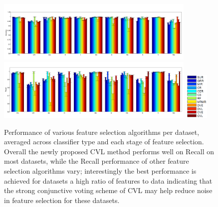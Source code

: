 \begin{figure}[tbp!]
\includegraphics[width=0.85\textwidth]{./figures/dataset_perf/Accuracy.pdf}\\
\includegraphics[width=0.85\textwidth]{./figures/dataset_perf/Recall.pdf}
\includegraphics[width=0.10\textwidth]{./figures/dataset_perf/legend.PNG}
\vspace{-2mm}
\caption{\footnotesize Performance of various feature selection algorithms per dataset, averaged across classifier type and each stage of feature selection.  Overall the newly proposed CVL method performs well on Recall on most datasets, while the Recall performance of other feature selection algorithms vary; interestingly the best performance is achieved for datasets a high ratio of features to data indicating that the strong conjunctive voting scheme of CVL may help reduce noise in feature selection for these datasets. }
\label{fig:perf_vs_dataset}
\vspace{-3mm}
\end{figure}

